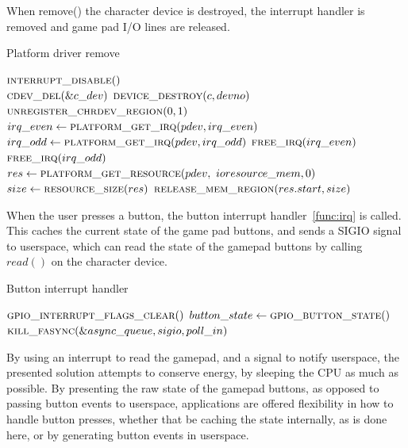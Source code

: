 When remove() the character device is destroyed, the interrupt handler is
removed and game pad I/O lines are released.
 
\begin{algorithm}[H]
  \footnotesize
  \caption{Platform driver remove}
  \begin{algorithmic}[1]
      \State $\Call{interrupt\_disable}{\null}$ \\
      \State $\Call{cdev\_del}{\&c\_dev}$
      \State $\Call{device\_destroy}{c, devno}$
      \State $\Call{unregister\_chrdev\_region}{0, 1}$ \\

      \State $irq\_even \gets \Call{platform\_get\_irq}{pdev, irq\_even}$
      \State $irq\_odd \gets \Call{platform\_get\_irq}{pdev, irq\_odd}$
      \State $\Call{free\_irq}{irq\_even}$
      \State $\Call{free\_irq}{irq\_odd}$ \\

      \State $res \gets \Call{platform\_get\_resource}{pdev, \
        ioresource\_mem, 0}$
      \State $size \gets \Call{resource\_size}{res}$
      \State $\Call{release\_mem\_region}{res.start, size}$
    \EndFunction
  \end{algorithmic}
  \label{func:remove}
\end{algorithm}

When the user presses a button, the button interrupt handler~\ref{func:irq} is
called. This caches the current state of the game pad buttons, and sends a
SIGIO signal to userspace, which can read the state of the gamepad buttons by
calling $read()$ on the character device.

\begin{algorithm}
  \footnotesize
  \caption{Button interrupt handler}
  \begin{algorithmic}[1]
      \State $\Call{gpio\_interrupt\_flags\_clear}{\null}$
      \State $button\_state \gets \Call{gpio\_button\_state}{\null}$
      \If {$async\_queue$}
        \State $\Call{kill\_fasync}{\&async\_queue, sigio, poll\_in}$
      \EndIf
    \EndFunction
  \end{algorithmic}
  \label{func:irq}
\end{algorithm}

By using an interrupt to read the gamepad, and a signal to notify userspace,
the presented solution attempts to conserve energy, by sleeping the CPU as much
as possible. By presenting the raw state of the gamepad buttons, as opposed to
passing button events to userspace, applications are offered flexibility in how
to handle button presses, whether that be caching the state internally, as is
done here, or by generating button events in userspace.

